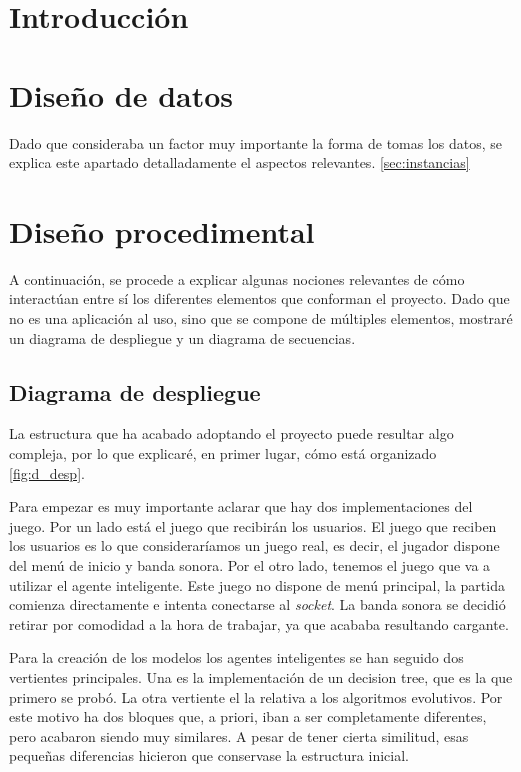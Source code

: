 
\section{Introducción}

\section{Diseño de datos}
Dado que consideraba un factor muy importante la forma de tomas los datos, se explica este apartado detalladamente el aspectos relevantes. \ref{sec:instancias}


\section{Diseño procedimental}
A continuación, se procede a explicar algunas nociones relevantes de cómo interactúan entre sí los diferentes elementos que conforman el proyecto. Dado que no es una aplicación al uso, sino que se compone de múltiples elementos, mostraré un diagrama de despliegue y un diagrama de secuencias.

\subsection{Diagrama de despliegue}
La estructura que ha acabado adoptando el proyecto puede resultar algo compleja, por lo que explicaré, en primer lugar, cómo está organizado \ref{fig:d_desp}.

Para empezar es muy importante aclarar que hay dos implementaciones del juego. Por un lado está el juego que recibirán los usuarios. El juego que reciben los usuarios es lo que consideraríamos un juego real, es decir, el jugador dispone del menú de inicio y banda sonora. Por el otro lado, tenemos el juego que va a utilizar el agente inteligente. Este juego no dispone de menú principal, la partida comienza directamente e intenta conectarse al \emph{socket}. La banda sonora se decidió retirar por comodidad a la hora de trabajar, ya que acababa resultando cargante.

Para la creación de los modelos los agentes inteligentes se han seguido dos vertientes principales. Una es la implementación de un decision tree, que es la que primero se probó. La otra vertiente el la relativa a los algoritmos evolutivos. Por este motivo ha dos bloques que, a priori, iban a ser completamente diferentes, pero acabaron siendo muy similares. A pesar de tener cierta similitud, esas pequeñas diferencias hicieron que conservase la estructura inicial.


